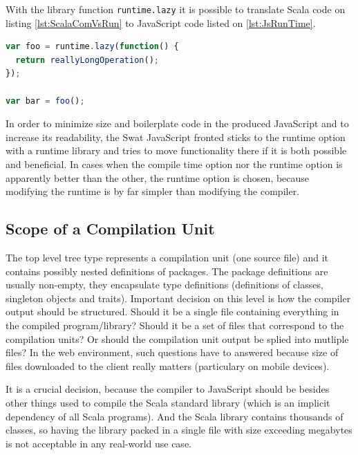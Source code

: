 \documentclass[12pt,a4paper]{report}
\begin{document}
With the library function \texttt{runtime.lazy} it is possible to translate Scala code on listing \ref{lst:ScalaComVsRun} to JavaScript code listed on \ref{lst:JsRunTime}.

\begin{minipage}{\linewidth}
\begin{lstlisting}[language=JavaScript,caption={Runtime option outcome.},label={lst:JsRunTime}]
var foo = runtime.lazy(function() {
  return reallyLongOperation();
});

var bar = foo();
\end{lstlisting}
\end{minipage}

In order to minimize size and boilerplate code in the produced JavaScript and to increase its readability, the Swat JavaScript fronted sticks to the runtime option with a runtime library and tries to move functionality there if it is both possible and beneficial. In cases when the compile time option nor the runtime option is apparently better than the other, the runtime option is chosen, because modifying the runtime is by far simpler than modifying the compiler.

\subsection{Scope of a Compilation Unit}

The top level tree type represents a compilation unit (one source file) and it contains possibly nested definitions of packages. The package definitions are usually non-empty, they encapsulate type definitions (definitions of classes, singleton objects and traits). Important decision on this level is how the compiler output should be structured. Should it be a single file containing everything in the compiled program/library? Should it be a set of files that correspond to the compilation units? Or should the compilation unit output be splied into mutliple files? In the web environment, such questions have to answered because size of files downloaded to the client really matters (particulary on mobile devices).

It is a crucial decision, because the compiler to JavaScript should be besides other things used to compile the Scala standard library \cite{ScalaLibrary} (which is an implicit dependency of all Scala programs). And the Scala library contains thousands of classes, so having the library packed in a single file with size exceeding megabytes is not acceptable in any real-world use case.
\end{document}
